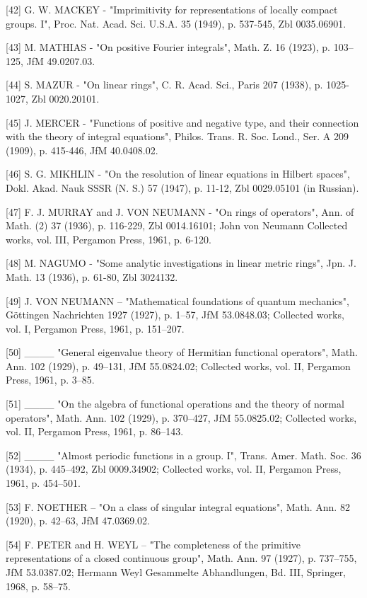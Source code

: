 {[}42{]} G. W. MACKEY - "Imprimitivity for representations of locally compact groups. I", Proc. Nat. Acad. Sci. U.S.A. 35 (1949), p. 537-545, Zbl 0035.06901.

{[}43{]} M. MATHIAS - "On positive Fourier integrals", Math. Z. 16 (1923), p. 103--125, JfM 49.0207.03.

{[}44{]} S. MAZUR - "On linear rings", C. R. Acad. Sci., Paris 207 (1938), p. 1025-1027, Zbl 0020.20101.

{[}45{]} J. MERCER - "Functions of positive and negative type, and their connection with the theory of integral equations", Philos. Trans. R. Soc. Lond., Ser. A 209 (1909), p. 415-446, JfM 40.0408.02.

{[}46{]} S. G. MIKHLIN - "On the resolution of linear equations in Hilbert spaces", Dokl. Akad. Nauk SSSR (N. S.) 57 (1947), p. 11-12, Zbl 0029.05101 (in Russian).

{[}47{]} F. J. MURRAY and J. VON NEUMANN - "On rings of operators", Ann. of Math. (2) 37 (1936), p. 116-229, Zbl 0014.16101; John von Neumann Collected works, vol. III, Pergamon Press, 1961, p. 6-120.

{[}48{]} M. NAGUMO - "Some analytic investigations in linear metric rings", Jpn. J. Math. 13 (1936), p. 61-80, Zbl 3024132.

{[}49{]} J. VON NEUMANN -- "Mathematical foundations of quantum mechanics", Göttingen Nachrichten 1927 (1927), p. 1--57, JfM 53.0848.03; Collected works, vol. I, Pergamon Press, 1961, p. 151--207.

{[}50{]} \_\_\_\_ "General eigenvalue theory of Hermitian functional operators", Math. Ann. 102 (1929), p. 49--131, JfM 55.0824.02; Collected works, vol. II, Pergamon Press, 1961, p. 3--85.

{[}51{]} \_\_\_\_ "On the algebra of functional operations and the theory of normal operators", Math. Ann. 102 (1929), p. 370--427, JfM 55.0825.02; Collected works, vol. II, Pergamon Press, 1961, p. 86--143.

{[}52{]} \_\_\_\_ "Almost periodic functions in a group. I", Trans. Amer. Math. Soc. 36 (1934), p. 445--492, Zbl 0009.34902; Collected works, vol. II, Pergamon Press, 1961, p. 454--501.

{[}53{]} F. NOETHER -- "On a class of singular integral equations", Math. Ann. 82 (1920), p. 42--63, JfM 47.0369.02.

{[}54{]} F. PETER and H. WEYL -- "The completeness of the primitive representations of a closed continuous group", Math. Ann. 97 (1927), p. 737--755, JfM 53.0387.02; Hermann Weyl Gesammelte Abhandlungen, Bd. III, Springer, 1968, p. 58--75.


